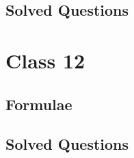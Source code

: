 \documentclass[journal]{IEEEtran}
\newcommand{\paperlabelprefix}{}
\begin{document}
\subsection{Solved Questions}
\renewcommand{\paperlabelprefix}{10-65-3-1}
\graphicspath{{10/}}

\clearpage

\section{Class 12}
\subsection{Formulae}
\renewcommand{\paperlabelprefix}{12-65-3-1}

\subsection{Solved Questions}
\renewcommand{\paperlabelprefix}{12-65-3-1}
\graphicspath{{12/}}

\end{document}
